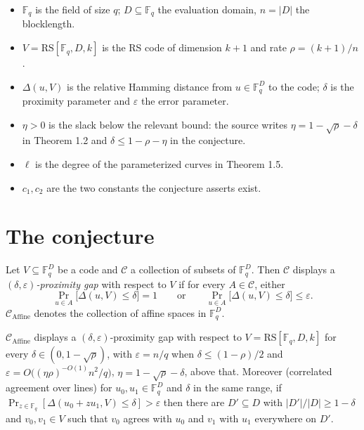 \documentclass{aicr-conjecture}
\newcommand{\F}{\mathbb{F}}
\newcommand{\eps}{\varepsilon}
\newcommand{\RS}{\mathrm{RS}}
\newcommand{\Caff}{\mathcal{C}_{\mathrm{Affine}}}
\newcommand{\dist}{\Delta}
\begin{document}
\begin{itemize}[nosep]
  \item $\F_{q}$ is the field of size $q$; $D \subseteq \F_{q}$ the
    evaluation domain, $n = |D|$ the blocklength.
  \item $V = \RS[\F_{q}, D, k]$ is the RS code of dimension $k+1$ and
    rate $\rho = (k+1)/n$.
  \item $\dist(u, V)$ is the relative Hamming distance from $u \in
    \F_{q}^{D}$ to the code; $\delta$ is the proximity parameter and
    $\eps$ the error parameter.
  \item $\eta > 0$ is the slack below the relevant bound: the source
    writes $\eta = 1 - \sqrt{\rho} - \delta$ in Theorem 1.2 and
    $\delta \le 1 - \rho - \eta$ in the conjecture.
  \item $\ell$ is the degree of the parameterized curves in
    Theorem 1.5.
  \item $c_{1}, c_{2}$ are the two constants the conjecture asserts
    exist.
\end{itemize}

\section{The conjecture}\label{sec:conjectures}

\begin{definition}
  \label{def:gap}
Let $V \subseteq \F_{q}^{D}$ be a code and $\mathcal{C}$ a collection of
subsets of $\F_{q}^{D}$. Then $\mathcal{C}$ displays a
\emph{$(\delta,\eps)$-proximity gap} with respect to $V$ if for every $A
\in \mathcal{C}$, either
\[
  \Pr_{u \in A}\bigl[ \dist(u, V) \le \delta \bigr] = 1
  \qquad\text{or}\qquad
  \Pr_{u \in A}\bigl[ \dist(u, V) \le \delta \bigr] \le \eps.
\]
$\Caff$ denotes the collection of affine spaces in $\F_{q}^{D}$.
\end{definition}

\begin{theorem}
  \label{thm:known}
$\Caff$ displays a $(\delta,\eps)$-proximity gap with respect to $V =
\RS[\F_{q},D,k]$ for every $\delta \in (0, 1 - \sqrt{\rho})$, with
$\eps = n/q$ when $\delta \le (1-\rho)/2$ and $\eps =
O\bigl((\eta\rho)^{-O(1)} n^{2}/q\bigr)$, $\eta = 1 - \sqrt{\rho} -
\delta$, above that. Moreover (correlated agreement over lines) for
$u_{0}, u_{1} \in \F_{q}^{D}$ and $\delta$ in the same range, if
$\Pr_{z \in \F_{q}}[\dist(u_{0} + z u_{1}, V) \le \delta] > \eps$ then
there are $D' \subseteq D$ with $|D'|/|D| \ge 1 - \delta$ and $v_{0},
v_{1} \in V$ such that $v_{0}$ agrees with $u_{0}$ and $v_{1}$ with
$u_{1}$ everywhere on $D'$.
\end{theorem}
\end{document}
